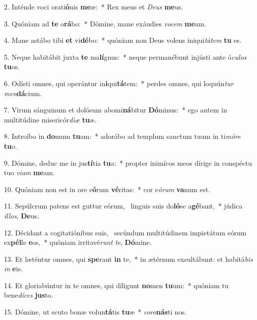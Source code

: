 2. Inténde voci orati\textbf{ó}nis \textbf{me}æ:~*  Rex meus et \textit{De}\textit{us} \textbf{me}us.\

3. Quóniam ad \textbf{te} o\textbf{rá}bo:~*  Dómine, mane exáudies \textit{vo}\textit{cem} \textbf{me}am.\

4. Mane astábo tibi \textbf{et} vi\textbf{dé}bo:~*  quóniam non Deus volens iniqui\textit{tá}\textit{tem} \textbf{tu} es.\

5. Neque habitábit juxta \textbf{te} ma\textbf{lí}gnus:~*  neque permanébunt injústi ante ó\textit{cu}\textit{los} \textbf{tu}os.\

6. Odísti omnes, qui operántur in\textbf{i}qui\textbf{tá}tem:~*  perdes omnes, qui loquún\textit{tur} \textit{men}\textbf{dá}cium.\

7. Virum sánguinum et dolósum abomi\textbf{ná}bitur \textbf{Dó}minus:~*  ego autem in multitúdine misericór\textit{di}\textit{æ} \textbf{tu}æ.\

8. Introíbo in \textbf{do}mum \textbf{tu}am:~*  adorábo ad templum sanctum tuum in ti\textit{mó}\textit{re} \textbf{tu}o.\

9. Dómine, deduc me in jus\textbf{tí}tia \textbf{tu}a:~*  propter inimícos meos dírige in conspéctu tuo \textit{vi}\textit{am} \textbf{me}am.\

10. Quóniam non est in ore e\textbf{ó}rum \textbf{vé}ritas:~*  cor e\textit{ó}\textit{rum} \textbf{va}num est.\

11. Sepúlcrum patens est guttur eórum, \dag\  linguis suis do\textbf{ló}se a\textbf{gé}bant,~*  júdica \textit{il}\textit{los}, \textbf{De}us.\

12. Décidant a cogitatiónibus suis, \dag\  secúndum multitúdinem impietátum eórum ex\textbf{pél}le \textbf{e}os,~*  quóniam irritavé\textit{runt} \textit{te}, \textbf{Dó}mine.\

13. Et læténtur omnes, qui \textbf{spe}rant \textbf{in} te,~*  in ætérnum exsultábunt: et habitá\textit{bis} \textit{in} \textbf{e}is.\

14. Et gloriabúntur in te omnes, qui díligunt \textbf{no}men \textbf{tu}um:~*  quóniam tu bene\textit{dí}\textit{ces} \textbf{jus}to.\

15. Dómine, ut scuto bonæ volun\textbf{tá}tis \textbf{tu}æ~*  \textit{co}\textit{ro}\textbf{nás}ti nos.\

